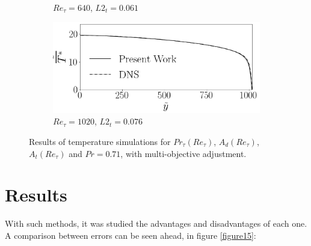 \documentclass[10pt]{article} %
\begin{document}
\begin{figure}[!h]
\begin{subfigure}[t]{0.5\textwidth}
		\caption{$Re_\tau = 640$, $L2_t = 0.061$}
	\end{subfigure}
	\begin{subfigure}[t]{0.45\textwidth}
		\centering
		\includegraphics[angle=0, scale=0.24]{fotos_formatacao_final/Temperature_1000_071_Genetic2temperature}
		\caption{$Re_\tau = 1020$, $L2_t = 0.076$}
	\end{subfigure}	
	\caption{Results of temperature simulations for $Pr_\tau(Re_\tau)$, $A_d(Re_\tau)$, $A_t(Re_\tau) $ and $Pr =0.71$, with multi-objective adjustment.}
	\vspace{-5mm}
\end{figure}

\newpage


 
\section{Results}

With such methods, it was studied the advantages and disadvantages of each one. A comparison between errors can be seen ahead, in figure \ref{figure15}:\\
\vspace{-0.5cm}
\end{document}
